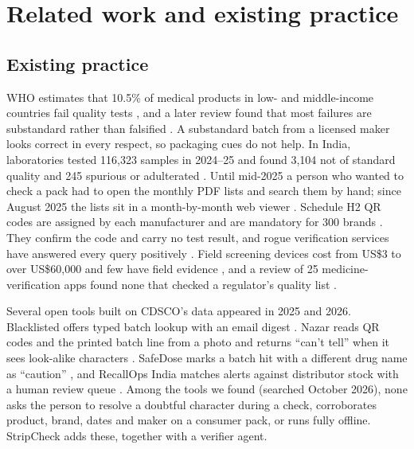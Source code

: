 \section{Related work and existing practice}
\label{sec:related}

\subsection{Existing practice}
WHO estimates that 10.5\% of medical products in low- and middle-income countries fail quality tests \cite{who2017oneinten}, and a later review found that most failures are substandard rather than falsified \cite{ozawa2022characterizing}. A substandard batch from a licensed maker looks correct in every respect, so packaging cues do not help. In India, laboratories tested 116,323 samples in 2024--25 and found 3,104 not of standard quality and 245 spurious or adulterated \cite{roy2025fiveyears}. Until mid-2025 a person who wanted to check a pack had to open the monthly PDF lists and search them by hand; since August 2025 the lists sit in a month-by-month web viewer \cite{cdsco2025nsqlink}. Schedule H2 QR codes are assigned by each manufacturer and are mandatory for 300 brands \cite{cdsco2023faqqr}. They confirm the code and carry no test result, and rogue verification services have answered every query positively \cite{who2021traceability}. Field screening devices cost from US\$3 to over US\$60,000 and few have field evidence \cite{vickers2018field,kovacs2014technologies}, and a review of 25 medicine-verification apps found none that checked a regulator's quality list \cite{ciapponi2021mobile}.

Several open tools built on CDSCO's data appeared in 2025 and 2026. Blacklisted offers typed batch lookup with an email digest \cite{blacklisted2026}. Nazar reads QR codes and the printed batch line from a photo and returns ``can't tell'' when it sees look-alike characters \cite{rastogi2026nazar}. SafeDose marks a batch hit with a different drug name as ``caution'' \cite{shaurya2026safedose}, and RecallOps India matches alerts against distributor stock with a human review queue \cite{ibnweb32026recallops}. Among the tools we found (searched October 2026), none asks the person to resolve a doubtful character during a check, corroborates product, brand, dates and maker on a consumer pack, or runs fully offline. StripCheck adds these, together with a verifier agent.

